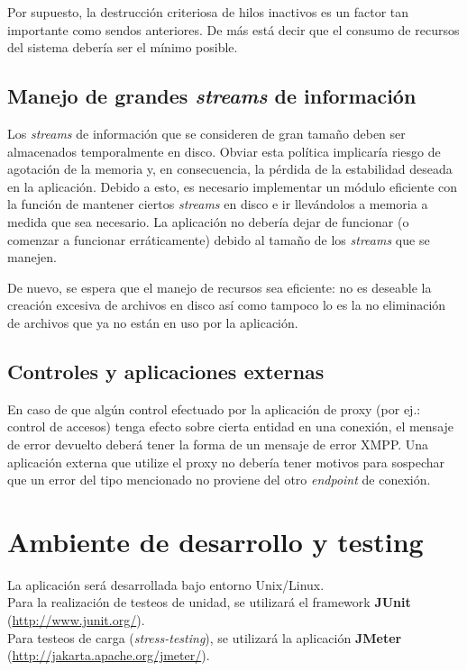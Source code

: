 \documentclass[a4paper,10pt]{article}
\begin{document}
Por supuesto, la destrucción criteriosa de hilos inactivos es un factor tan importante como sendos anteriores. De más está decir que el consumo de recursos del sistema debería
ser el mínimo posible.

\subsection{Manejo de grandes \textit{streams} de información}
Los \textit{streams} de información que se consideren de gran tamaño deben ser almacenados temporalmente en disco. Obviar esta política implicaría riesgo de agotación de la memoria y, en consecuencia,
la pérdida de la estabilidad deseada en la aplicación. Debido a esto, es necesario implementar un módulo eficiente con la función de mantener ciertos \textit{streams}
en disco e ir llevándolos a memoria a medida que sea necesario. La aplicación no debería dejar de funcionar (o comenzar a funcionar erráticamente) debido al tamaño de los
\textit{streams} que se manejen.

De nuevo, se espera que el manejo de recursos sea eficiente: no es deseable la creación excesiva de archivos en disco así como tampoco lo es la no eliminación de archivos que ya no están en uso
por la aplicación.

\subsection{Controles y aplicaciones externas}
En caso de que algún control efectuado por la aplicación de proxy (por ej.: control de accesos) tenga efecto sobre cierta entidad en una conexión, el mensaje de error devuelto deberá tener
la forma de un mensaje de error XMPP. Una aplicación externa que utilize el proxy no debería tener motivos para sospechar que un error del tipo mencionado no proviene del otro
\textit{endpoint} de conexión.


\section{Ambiente de desarrollo y testing}
La aplicación será desarrollada bajo entorno Unix/Linux.\\

Para la realización de testeos de unidad, se utilizará el framework \textbf{JUnit} (\url{http://www.junit.org/}).\\

Para testeos de carga (\textit{stress-testing}), se utilizará la aplicación \textbf{JMeter} (\url{http://jakarta.apache.org/jmeter/}).\\
\end{document}

